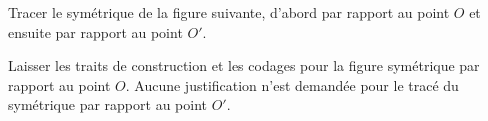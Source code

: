 
\begin{exercice}\label{exo2smath-0066}

    Tracer le symétrique de la figure suivante, d'abord par rapport au point \( O\) et ensuite par rapport au point \( O'\).

\begin{center}
   
\end{center}

    Laisser les traits de construction et les codages pour la figure symétrique par rapport au point \( O\). Aucune justification n'est demandée pour le tracé du symétrique par rapport au point \( O'\).


\end{exercice}
